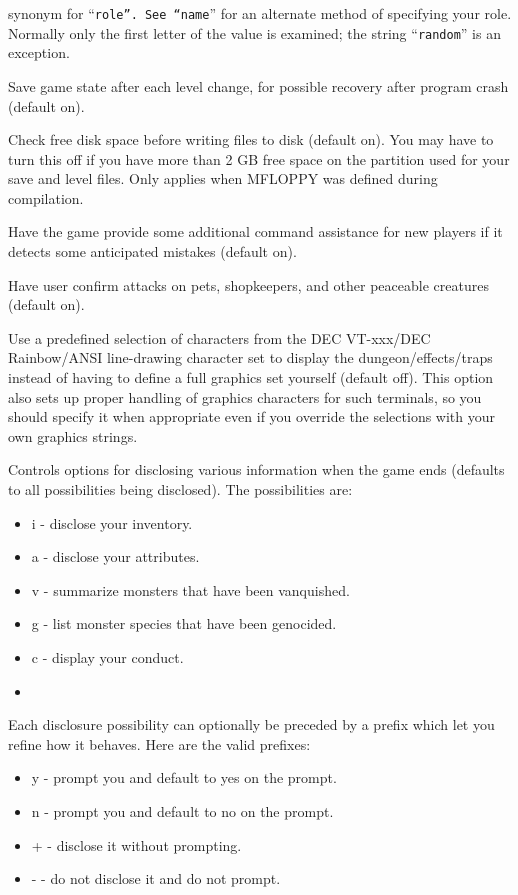 synonym for ``{\tt role''.  See ``name}'' for an alternate method
of specifying your role.  Normally only the first letter of
the value is examined; the string ``{\tt random}'' is an exception.
\item[\tb{checkpoint}]
Save game state after each level change, for possible recovery after
program crash (default on).
\item[\tb{checkspace}]
Check free disk space before writing files to disk (default on).
You may have to turn this off if you have more than 2 GB free space
on the partition used for your save and level files.
Only applies when MFLOPPY was defined during compilation.
\item[\tb{cmdassist}]
Have the game provide some additional command assistance for 
new players if it detects some anticipated mistakes (default on).
\item[\tb{``confirm ''}]
Have user confirm attacks on pets, shopkeepers, and other
peaceable creatures (default on).
\item[\tb{DECgraphics}]
Use a predefined selection of characters from the DEC VT-xxx/DEC
Rainbow/ANSI line-drawing character set to display the dungeon/effects/traps
instead of having to define a full graphics set yourself (default off).
This option also sets up proper handling of graphics
characters for such terminals, so you should specify it when appropriate
even if you override the selections with your own graphics strings.
\item[\tb{disclose}]
Controls options for disclosing various information when the game ends (defaults
to all possibilities being disclosed).
The possibilities are:
\item \begin{itemize}
\item i - disclose your inventory.
\item a - disclose your attributes.
\item v - summarize monsters that have been vanquished.
\item g - list monster species that have been genocided.
\item c - display your conduct.
\item \end{itemize}
Each disclosure possibility can optionally be preceded by a prefix which
let you refine how it behaves. Here are the valid prefixes:
\begin{itemize}
\item y - prompt you and default to yes on the prompt.
\item n - prompt you and default to no on the prompt.
\item + - disclose it without prompting.
\item - - do not disclose it and do not prompt.
\end{itemize}
